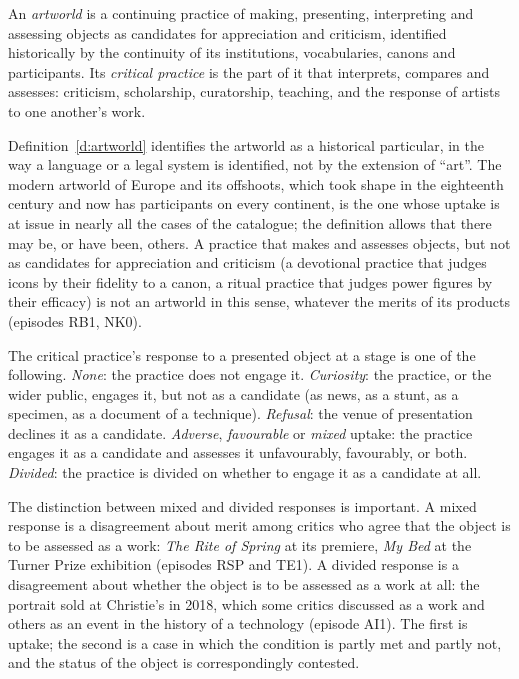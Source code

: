 \documentclass{situationist-preprint}
\begin{document}
\begin{definition}[Artworld]\label{d:artworld}
An \emph{artworld} is a continuing practice of making, presenting, interpreting and assessing objects as candidates for appreciation and criticism, identified historically by the continuity of its institutions, vocabularies, canons and participants. Its \emph{critical practice} is the part of it that interprets, compares and assesses: criticism, scholarship, curatorship, teaching, and the response of artists to one another's work.
\end{definition}

Definition~\ref{d:artworld} identifies the artworld as a historical particular, in the way a language or a legal system is identified, not by the extension of \enquote{art}. The modern artworld of Europe and its offshoots, which took shape in the eighteenth century \citep{Kristeller1951,Shiner2001} and now has participants on every continent, is the one whose uptake is at issue in nearly all the cases of the catalogue; the definition allows that there may be, or have been, others. A practice that makes and assesses objects, but not as candidates for appreciation and criticism (a devotional practice that judges icons by their fidelity to a canon, a ritual practice that judges power figures by their efficacy) is not an artworld in this sense, whatever the merits of its products (episodes RB1, NK0).

\begin{definition}\label{d:modes}
The critical practice's response to a presented object at a stage is one of the following. \emph{None}: the practice does not engage it. \emph{Curiosity}: the practice, or the wider public, engages it, but not as a candidate (as news, as a stunt, as a specimen, as a document of a technique). \emph{Refusal}: the venue of presentation declines it as a candidate. \emph{Adverse}, \emph{favourable} or \emph{mixed} uptake: the practice engages it as a candidate and assesses it unfavourably, favourably, or both. \emph{Divided}: the practice is divided on whether to engage it as a candidate at all.
\end{definition}

The distinction between mixed and divided responses is important. A mixed response is a disagreement about merit among critics who agree that the object is to be assessed as a work: \emph{The Rite of Spring} at its premiere, \emph{My Bed} at the Turner Prize exhibition (episodes RSP and TE1). A divided response is a disagreement about whether the object is to be assessed as a work at all: the portrait sold at Christie's in 2018, which some critics discussed as a work and others as an event in the history of a technology (episode AI1). The first is uptake; the second is a case in which the condition is partly met and partly not, and the status of the object is correspondingly contested.
\end{document}
